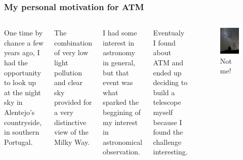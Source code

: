 \documentclass{beamer}
\begin{document}
\begin{frame}
\frametitle{My personal motivation for ATM}
\begin{columns}
One time by chance a few years ago, I had the opportunity to look up at the night sky in Alentejo's countryside, in southern Portugal.

The combination of very low light pollution and clear sky provided for a very distinctive view of the Milky Way.

I had some interest in astronomy in general, but that event was what sparked the beggining of my interest in astronomical observation.

Eventualy I found about ATM and ended up deciding to build a telescope myself because I found the challenge interesting.
\begin{figure}
\includegraphics[scale=0.45]{assets/800px-Starry_Night_at_La_Silla.jpg}
\caption{Not me!}
\end{figure}
\end{columns}
\end{frame}
\end{document}

